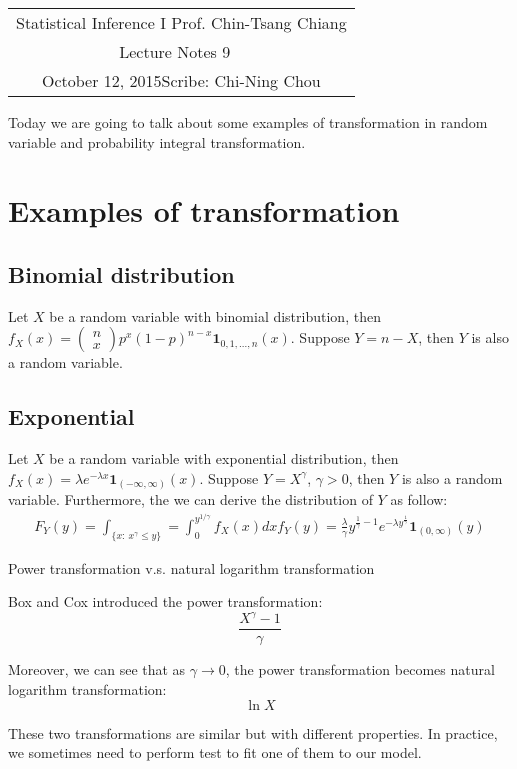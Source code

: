 \documentclass[11pt]{article}
\newcommand{\scribe}{Chi-Ning Chou}
\newcommand{\lecnum}{9}
\newcommand{\lecdate}{October 12, 2015}
\begin{document}
	
	\begin{center}
		\renewcommand{\arraystretch}{2}
		\begin{bfseries}
			\begin{tabular}{|c|}
				\hline
				Statistical Inference I \hfill Prof. Chin-Tsang Chiang\\
				\hspace{15em} {\large Lecture Notes \lecnum} \hspace{15em}\ \\
				\lecdate \hfill Scribe: \scribe\\
				\hline
			\end{tabular}
			\renewcommand{\arraystretch}{1}
		\end{bfseries}
	\end{center}
	
Today we are going to talk about some examples of transformation in random variable and probability integral transformation.

\section{Examples of transformation}
\subsection{Binomial distribution}
Let $X$ be a random variable with binomial distribution, then $f_X(x) = \left(\begin{array}{c}
n\\
x
\end{array}\right)p^x(1-p)^{n-x}\mathbf{1}_{0,1,...,n}(x)$. Suppose $Y=n-X$, then $Y$ is also a random variable.

\subsection{Exponential}
Let $X$ be a random variable with exponential distribution, then $f_X(x) = \lambda e^{-\lambda x}\mathbf{1}_{(-\infty,\infty)}(x)$. Suppose $Y=X^{\gamma}$, $\gamma>0$, then $Y$ is also a random variable. Furthermore, the we can derive the distribution of $Y$ as follow:
\begin{align*}
F_Y(y) = \int_{\{x:\ x^{\gamma}\leq y \}} = \int_0^{y^{1/\gamma}}f_X(x)dx
f_Y(y) = \frac{\lambda}{\gamma}y^{\frac{1}{\gamma}-1}e^{-\lambda y^{\frac{1}{\gamma}}}\mathbf{1}_{(0,\infty)}(y)
\end{align*}

\begin{remark}{Power transformation v.s. natural logarithm transformation}
	
Box and Cox introduced the power transformation:
$$\frac{X^{\gamma}-1}{\gamma}$$

Moreover, we can see that as $\gamma\rightarrow0$, the power transformation becomes natural logarithm transformation:
$$\ln X$$

These two transformations are similar but with different properties. In practice, we sometimes need to perform test to fit one of them to our model.
\end{remark}
\end{document}
